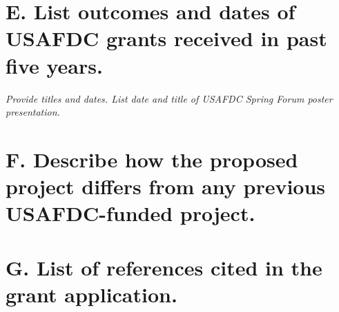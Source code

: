 \documentclass[11pt]{article}
\begin{document}
\section*{E.	List outcomes and dates of USAFDC grants received in past five years.}

\textit{Provide titles and dates.  List date and title of USAFDC Spring Forum poster presentation.}















\section*{F.	Describe how the proposed project differs from any previous USAFDC-funded project.}

















\section*{G. List of references cited in the grant application.}





\end{document}
